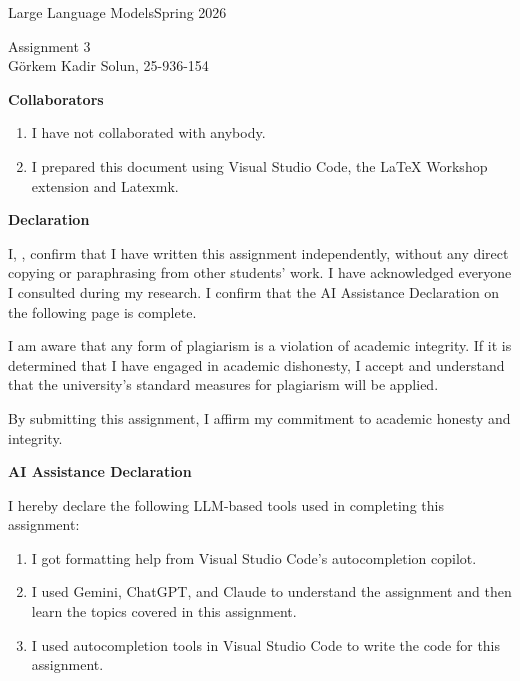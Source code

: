\documentclass[a4paper,12pt]{ETHexercise}
\begin{document}
{\Large Large Language Models}{Spring 2026}

\vspace{5mm}
\begin{center}
    {\Huge Assignment 3 \\ \vspace{5mm} \Large G\"orkem Kadir Solun, 25-936-154}\\
\end{center}

\vspace{3cm}

\begin{center}
    {\large \textbf{Collaborators}}
    \begin{enumerate}
        \item I have not collaborated with anybody.
        \item I prepared this document using Visual Studio Code, the LaTeX Workshop extension and Latexmk.
    \end{enumerate}
\end{center}

\begin{center}
    {\large \textbf{Declaration}}
\end{center}

I, \textcolor{ETHGreen}{}, confirm that I have written this assignment independently, without any direct copying or paraphrasing from other students' work. 
I have acknowledged everyone I consulted during my research.
I confirm that the AI Assistance Declaration on the following page is complete.

I am aware that any form of plagiarism is a violation of academic integrity. If it is determined that I have engaged in academic dishonesty, I accept and understand that the university's standard measures for plagiarism will be applied.

By submitting this assignment, I affirm my commitment to academic honesty and integrity.


\vspace{5em}
\begin{center}
    {\large \textbf{AI Assistance Declaration}}
\end{center}

I hereby declare the following LLM-based tools used in completing this assignment:

\begin{center}
    \begin{enumerate}
        \item I got formatting help from Visual Studio Code's autocompletion copilot.
        \item I used Gemini, ChatGPT, and Claude to understand the assignment and then learn the topics covered in this assignment.
        \item I used autocompletion tools in Visual Studio Code to write the code for this assignment.
    \end{enumerate}
\end{center}
\vspace{10em}

\newpage

\end{document}
